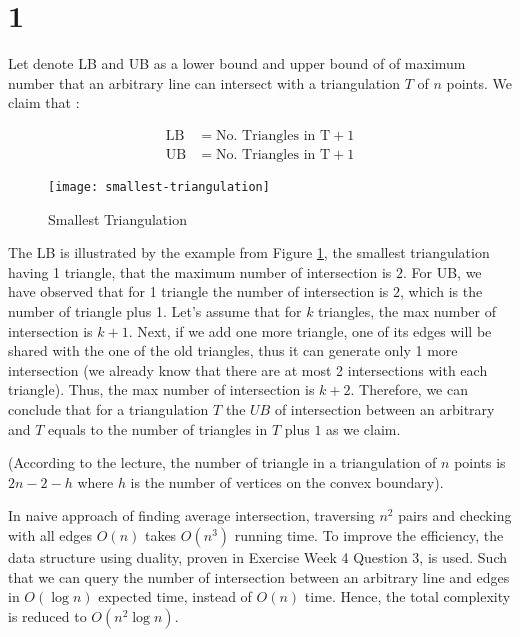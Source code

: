 
\section*{1}

Let denote LB and UB as a lower bound and upper bound of
of maximum number that an arbitrary line can intersect with a
triangulation $T$ of $n$ points. We claim that :

\begin{align*}
    \mathrm{LB} &= \text{No. Triangles in T} + 1\\
    \mathrm{UB} &= \text{No. Triangles in T} + 1
\end{align*}
\begin{figure}[h]
    \begin{center}
        \texttt{[image: smallest-triangulation]}
        \caption{Smallest Triangulation}
        \label{fig:smallest-triangulation}
    \end{center}
\end{figure}

The LB is illustrated by the example from Figure \ref{fig:smallest-triangulation}, the smallest triangulation having 1 triangle, that the maximum number of intersection is $2$.
For UB, we have observed that for 1 triangle the number of intersection is $2$,
which is the number of triangle plus 1. Let's assume that for $k$ triangles,
the max number of intersection is $k+1$. Next, if we add one more triangle,
one of its edges will be shared with the one of the old triangles, thus
it can generate only 1 more intersection (we already know that there are at most 2 intersections
with each triangle). Thus, the max number of intersection
is $k+2$. Therefore, we can conclude that for a triangulation $T$ the $UB$ of
intersection between an arbitrary and $T$ equals to the number of triangles
in $T$ plus $1$ as we claim.

(According to the lecture, the number of triangle in a triangulation of $n$ points is $2n - 2 - h$ where $h$
is the number of vertices on the convex boundary).

In naive approach of finding average intersection, traversing $n^2$ pairs and checking with all edges $O(n)$
takes $O(n^3)$ running time. To improve the efficiency, the data structure using duality, proven in Exercise Week 4 Question 3,
is used. Such that we can query the number of intersection between an arbitrary line and
edges in $O(\log{n})$ expected time, instead of $O(n)$ time. Hence, the total complexity is reduced to $O(n^2 \log {n})$.
